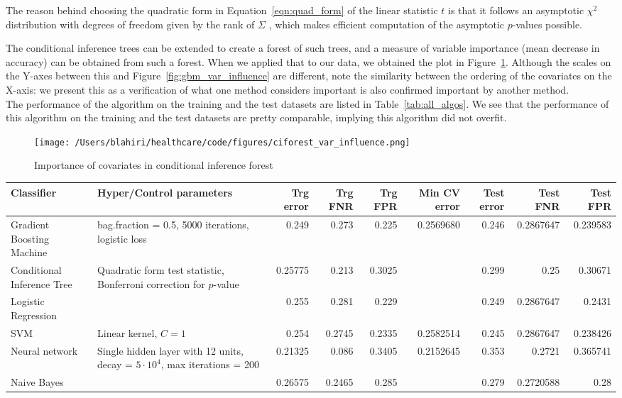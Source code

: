 The reason behind choosing the quadratic form in Equation~\ref{eqn:quad_form} of the linear statistic $t$ is that it follows an asymptotic ${\chi}^2$ distribution with degrees of freedom given by the rank of $\Sigma$ \cite{Rasch1995}, which makes efficient computation of the asymptotic $p$-values possible.

The conditional inference trees can be extended to create a forest of such trees, and a measure of variable importance (mean decrease in accuracy) can be obtained from such a forest. When we applied that to our data, we obtained the plot in Figure~\ref{fig:ciforest_var_influence}. Although the scales on the Y-axes between this and Figure~\ref{fig:gbm_var_influence} are different,  note the similarity between the ordering of the covariates on the X-axis: we present this as a verification of what one method considers important is also confirmed important by another method.\\

The performance of the algorithm on the training and the test datasets are listed in Table~\ref{tab:all_algos}. We see that the performance of this algorithm on the training and the test datasets are pretty comparable, implying this algorithm did not overfit. 

\begin{figure}[!h]
    \centering
    \texttt{[image: /Users/blahiri/healthcare/code/figures/ciforest\_var\_influence.png]}
    \caption{\small Importance of covariates in conditional inference forest}
    \label{fig:ciforest_var_influence}
\end{figure}

\begin{table*}[!h]
\centering
\caption{Summary of performance of all classifiers}
\begin{tabular}{p{2cm}p{2cm}rrrrrrr}
\hline
Classifier & Hyper/Control parameters & Trg error & Trg FNR & Trg FPR & Min CV error & Test error & Test FNR & Test FPR\\
\hline
Gradient Boosting Machine & bag.fraction = 0.5, 5000 iterations, logistic loss & 0.249 & 0.273 & 0.225 & 0.2569680 & 0.246 & 0.2867647 & 0.239583\\
Conditional Inference Tree & Quadratic form test statistic, Bonferroni correction for $p$-value & 0.25775 & 0.213 & 0.3025 & & 0.299 & 0.25 & 0.30671\\
Logistic Regression & & 0.255 & 0.281 & 0.229 & & 0.249 & 0.2867647 & 0.2431\\
SVM & Linear kernel, $C = 1$ & 0.254 & 0.2745 & 0.2335 & 0.2582514 & 0.245 & 0.2867647 & 0.238426\\
Neural network & Single hidden layer with 12 units, decay = $5{\cdot}10^4$, max iterations = 200 & 0.21325 & 0.086 & 0.3405 & 0.2152645 & 0.353 & 0.2721 & 0.365741\\
Naive Bayes & & 0.26575 & 0.2465 & 0.285 & & 0.279 & 0.2720588 & 0.28\\
\hline
\end{tabular}
\label{tab:all_algos}
\end{table*}


